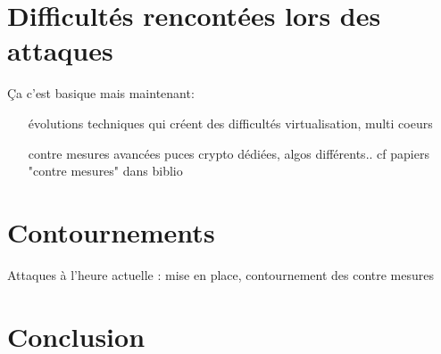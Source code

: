 \documentclass[a4paper,11pt]{article}
\begin{document}
\section{Difficultés rencontées lors des attaques} %
Ça c'est basique mais maintenant:
\begin{itemize}
\item[évolutions techniques qui créent des difficultés] virtualisation, multi coeurs
\item[contre mesures avancées]  puces crypto dédiées, algos différents.. cf papiers "contre mesures" dans biblio
\end{itemize}

\section{Contournements}
Attaques à l'heure actuelle : mise en place, contournement des contre mesures

\section*{Conclusion}

\newpage
\nocite{*}


\end{document}

